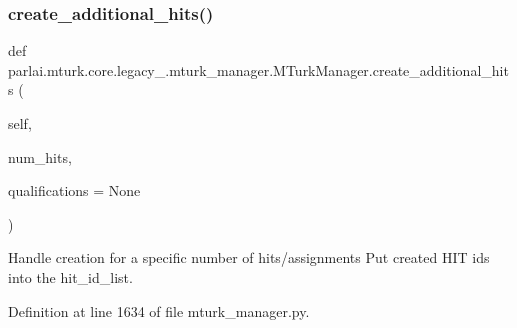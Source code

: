 \subsubsection{\texorpdfstring{create\+\_\+additional\+\_\+hits()}{create\_additional\_hits()}}
{\footnotesize\ttfamily def parlai.\+mturk.\+core.\+legacy\+\_.\+mturk\+\_\+manager.\+M\+Turk\+Manager.\+create\+\_\+additional\+\_\+hits (\begin{DoxyParamCaption}\item[{}]{self,  }\item[{}]{num\+\_\+hits,  }\item[{}]{qualifications = {\ttfamily None} }\end{DoxyParamCaption})}

\begin{DoxyVerb}Handle creation for a specific number of hits/assignments Put created HIT ids
into the hit_id_list.
\end{DoxyVerb}
 

Definition at line 1634 of file mturk\+\_\+manager.\+py.


